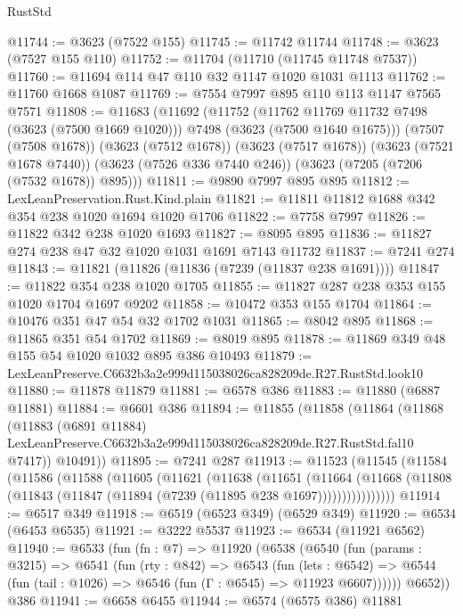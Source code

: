 \begin{lexlean}{RustStd}
\begin{coremodule}
@11744 := @3623 (@7522 @155)
@11745 := @11742 @11744
@11748 := @3623 (@7527 @155 @110)
@11752 := @11704 (@11710 (@11745 @11748 @7537))
@11760 := @11694 @114 @47 @110 @32 @1147 @1020 @1031 @1113
@11762 := @11760 @1668 @1087
@11769 := @7554 @7997 @895 @110 @113 @1147 @7565 @7571
@11808 := @11683
    (@11692
      (@11752
        (@11762 @11769 @11732 @7498 (@3623 (@7500 @1669 @1020)))
        @7498
        (@3623 (@7500 @1640 @1675)))
      (@7507 (@7508 @1678))
      (@3623 (@7512 @1678))
      (@3623 (@7517 @1678))
      (@3623 (@7521 @1678 @7440))
      (@3623 (@7526 @336 @7440 @246))
      (@3623 (@7205 (@7206 (@7532 @1678)) @895)))
@11811 := @9890 @7997 @895 @895
@11812 := LexLeanPreservation.Rust.Kind.plain
@11821 := @11811 @11812 @1688 @342 @354 @238 @1020 @1694 @1020 @1706
@11822 := @7758 @7997
@11826 := @11822 @342 @238 @1020 @1693
@11827 := @8095 @895
@11836 := @11827 @274 @238 @47 @32 @1020 @1031 @1691 @7143 @11732
@11837 := @7241 @274
@11843 := @11821 (@11826 (@11836 (@7239 (@11837 @238 @1691))))
@11847 := @11822 @354 @238 @1020 @1705
@11855 := @11827 @287 @238 @353 @155 @1020 @1704 @1697 @9202
@11858 := @10472 @353 @155 @1704
@11864 := @10476 @351 @47 @54 @32 @1702 @1031
@11865 := @8042 @895
@11868 := @11865 @351 @54 @1702
@11869 := @8019 @895
@11878 := @11869 @349 @48 @155 @54 @1020 @1032 @895 @386 @10493
@11879 := LexLeanPreserve.C6632b3a2e999d115038026ca828209de.R27.RustStd.look10
@11880 := @11878 @11879
@11881 := @6578 @386
@11883 := @11880 (@6887 @11881)
@11884 := @6601 @386
@11894 := @11855
    (@11858
      (@11864
        (@11868
          (@11883
            (@6891 @11884)
            LexLeanPreserve.C6632b3a2e999d115038026ca828209de.R27.RustStd.fal10
            @7417))
        @10491))
@11895 := @7241 @287
@11913 := @11523
    (@11545
      (@11584
        (@11586
          (@11588
            (@11605
              (@11621
                (@11638
                  (@11651
                    (@11664
                      (@11668
                        (@11808 (@11843 (@11847 (@11894 (@7239 (@11895 @238 @1697))))))))))))))))
@11914 := @6517 @349
@11918 := @6519 (@6523 @349) (@6529 @349)
@11920 := @6534 (@6453 @6535)
@11921 := @3222 @5537
@11923 := @6534 (@11921 @6562)
@11940 := @6533
    (fun (fn : @7) =>
    @11920
      (@6538
        (@6540
          (fun (params : @3215) =>
          @6541
            (fun (rty : @842) =>
            @6543
              (fun (lets : @6542) =>
              @6544 (fun (tail : @1026) => @6546 (fun (Γ : @6545) => @11923 @6607))))))
        @6652))
    @386
@11941 := @6658 @6455
@11944 := @6574 (@6575 @386) @11881

\end{coremodule}
\end{lexlean}
